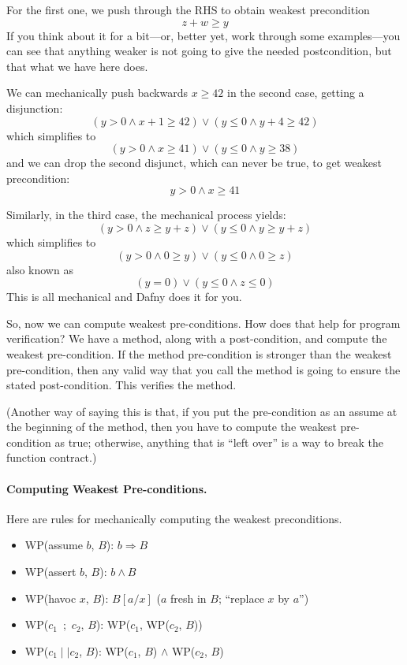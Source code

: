 \documentclass[11pt]{article}
\begin{document}
For the first one, we push through the RHS to obtain weakest precondition
\[ z + w \geq y \]
If you think about it for a bit---or, better yet, work through some examples---you can see that anything weaker is not going to give the needed postcondition, but that what we have here does.

We can mechanically push backwards $x \geq 42$ in the second case, getting a disjunction:
\[ (y > 0 \wedge x + 1 \geq 42) \vee (y \leq 0 \wedge y + 4 \geq 42) \]
which simplifies to
\[ (y > 0 \wedge x \geq 41) \vee (y \leq 0 \wedge y  \geq 38) \]
and we can drop the second disjunct, which can never be true, to get weakest precondition:
\[ y > 0 \wedge x \geq 41 \]

Similarly, in the third case, the mechanical process yields:
\[ (y > 0 \wedge z \geq y + z) \vee (y \leq 0 \wedge y \geq y + z) \]
which simplifies to
\[ (y > 0 \wedge 0 \geq y) \vee (y \leq 0 \wedge 0 \geq z) \]
also known as
\[ (y = 0) \vee (y \leq 0 \wedge z \leq 0) \]
This is all mechanical and Dafny does it for you.

So, now we can compute weakest pre-conditions. How does that help for program verification?
We have a method, along with a post-condition, and compute the weakest pre-condition.
If the method pre-condition is stronger than the weakest pre-condition, then any valid
way that you call the method is going to ensure the stated post-condition. This verifies
the method.

(Another way of saying this is that, if you put the pre-condition as an assume at the
beginning of the method, then you have to compute the weakest pre-condition as \textsf{true};
otherwise, anything that is ``left over'' is a way to break the function contract.)

\paragraph{Computing Weakest Pre-conditions.} Here are rules for mechanically computing
the weakest preconditions.

\begin{itemize}[noitemsep]
\item WP(\textsf{assume }$b$, $B$): $b \Rightarrow B$
\item WP(\textsf{assert }$b$, $B$): $b \wedge B$
\item WP(\textsf{havoc }$x$, $B$): $B[a/x]$ \hspace*{5em} ($a$ fresh in $B$; ``replace $x$ by $a$'')
\item WP($c_1$~;~$c_2$, $B$): WP($c_1$, WP($c_2$, $B$))
  \item WP($c_1 \mid\mid c_2$, $B$): WP($c_1$, $B$) $\wedge$ WP($c_2$, $B$)
\end{itemize}
\end{document}
